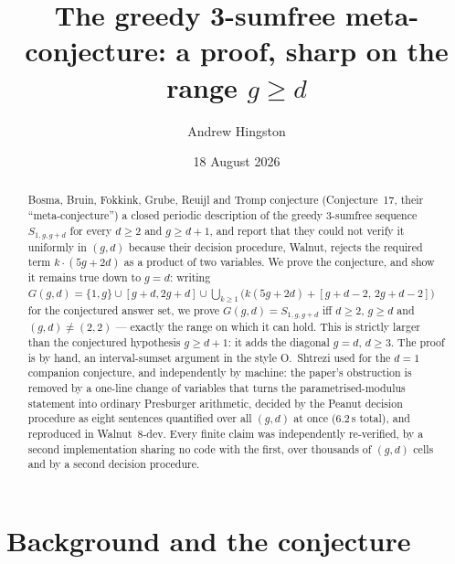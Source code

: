 \documentclass[10pt,reqno]{amsart}
\theoremstyle{plain}
\theoremstyle{definition}
\theoremstyle{remark}
\numberwithin{theorem}{section}
\newcommand{\G}{G}
\begin{document}
\title[Conjecture 17 on greedy 3-sumfree sequences]{The greedy 3-sumfree meta-conjecture:
a proof, sharp on the range $g \ge d$}

\author{Andrew Hingston}

\date{18 August 2026}


\begin{abstract}
Bosma, Bruin, Fokkink, Grube, Reuijl and Tromp \cite{Fokkink} conjecture (Conjecture~17,
their ``meta-conjecture'') a closed periodic description of the greedy 3-sumfree sequence
$S_{1,g,g+d}$ for every $d \ge 2$ and $g \ge d+1$, and report that they could not verify it
uniformly in $(g,d)$ because their decision procedure, Walnut, rejects the required term
$k \cdot(5g+2d)$ as a product of two variables. We prove the conjecture, and show it remains
true down to $g = d$: writing $\G(g,d) = \{1,g\} \cup [g+d,2g+d] \cup
\bigcup_{k \ge 1}\bigl(k(5g{+}2d) + [g{+}d{-}2,\,2g{+}d{-}2]\bigr)$ for the conjectured answer
set, we prove $\G(g,d) = S_{1,g,g+d}$ iff $d \ge 2$, $g \ge d$ and $(g,d) \ne (2,2)$ ---
exactly the range on which it can hold. This is strictly larger than the
conjectured hypothesis $g \ge d+1$: it adds the diagonal $g=d$, $d \ge 3$. The proof is by
hand, an interval-sumset argument in the style O.\ Shtrezi used for the $d=1$ companion
conjecture, and independently by machine: the paper's obstruction is removed by a one-line
change of variables that turns the parametrised-modulus statement into ordinary Presburger
arithmetic, decided by the Peanut decision procedure as eight sentences quantified over all
$(g,d)$ at once (6.2\,s total), and reproduced in Walnut~8-dev. Every finite claim was
independently re-verified, by a second implementation sharing no code with the first, over
thousands of $(g,d)$ cells and by a second decision procedure.
\end{abstract}

\maketitle

\section{Background and the conjecture}
\label{sec:bg}
\end{document}
